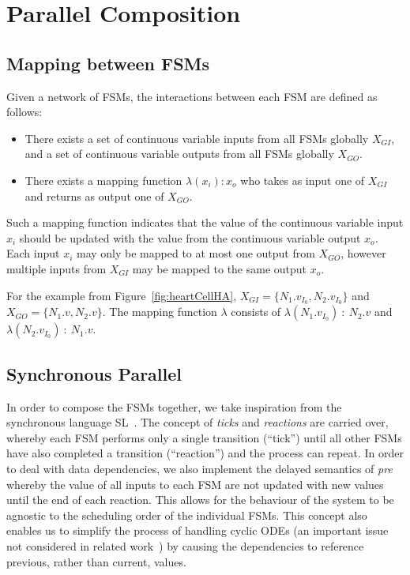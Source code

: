 \section{Parallel Composition}
\label{sec:composition}


\subsection{Mapping between \acp{FSM}}
\label{sec:mapping}

Given a network of \acp{FSM}, the interactions between each \ac{FSM} are 
defined as follows:
\begin{itemize}
	\item There exists a set of continuous variable inputs from all \acp{FSM} 
	globally $X_{GI}$, and a set of continuous variable outputs from all 
	\acp{FSM} globally $X_{GO}$.
	\item There exists a mapping function $\lambda(x_i) : x_o$ who takes as 
	input one of $X_{GI}$ and returns as output one of $X_{GO}$.
\end{itemize}

Such a mapping function indicates that the value of the continuous variable 
input $x_i$ should be updated with the value from the continuous variable 
output $x_o$.  Each input $x_i$ may only be mapped to at most one 
output from $X_{GO}$, however multiple inputs from $X_{GI}$ may be mapped to 
the same output $x_o$.

For the example from Figure~\ref{fig:heartCellHA}, 
\mbox{$X_{GI} = \{N_{1}.v_{I_{0}},N_{2}.v_{I_{0}}\}$} and 
\mbox{$X_{GO} = \{N_{1}.v,N_{2}.v\}$}. 
The mapping function $\lambda$ consists of 
$\lambda(N_{1}.v_{I_{0}})~:~N_{2}.v$ and $\lambda(N_{2}.v_{I_{0}})~:~N_{1}.v$.

\subsection{Synchronous Parallel}
\label{sec:synchronousParallel}

%  

In order to compose the \acp{FSM} together, we take inspiration
from the synchronous language SL~\cite{SlLanguage}.  The 
concept of \emph{ticks} and \emph{reactions} are carried over, whereby each 
\ac{FSM} performs 
only a single transition (``tick'') until all other \acp{FSM} have also 
completed a transition (``reaction'') and the process can repeat.  In order to
deal with data dependencies, we also implement the delayed semantics of 
\emph{pre}
whereby the value of all inputs to each \ac{FSM} are not updated with
new values until the end of each reaction.  This allows for the behaviour of 
the system to be agnostic to the scheduling order of the individual 
\acp{FSM}.  This concept also enables us to simplify the process of 
handling cyclic \acp{ODE} (an important issue not considered in related 
work~\cite{kim2003modular}) by causing the dependencies to reference
previous, rather than current, values.

